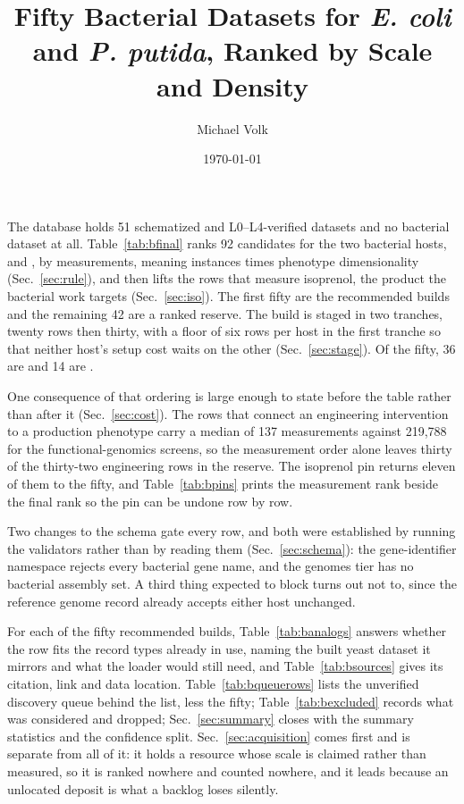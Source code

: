 \documentclass[10pt,a4paper]{article}
\title{\vspace{-1.5em}Fifty Bacterial Datasets for \emph{E. coli} and \emph{P. putida},
Ranked by Scale and Density}
\author{Michael Volk}
\date{\today}
\begin{document}
\maketitle
\thispagestyle{empty}

\noindent
The database holds 51 schematized and L0--L4-verified 
datasets and no bacterial dataset at all. Table~\ref{tab:bfinal} ranks 92 candidates for
the two bacterial hosts,  and , by
measurements, meaning instances times phenotype dimensionality (Sec.~\ref{sec:rule}), and
then lifts the rows that measure isoprenol, the product the bacterial work targets
(Sec.~\ref{sec:iso}). The first fifty are the recommended builds and the remaining 42 are
a ranked reserve. The
build is staged in two tranches, twenty rows then thirty, with a floor of six rows per
host in the first tranche so that neither host's setup cost waits on the other
(Sec.~\ref{sec:stage}). Of the fifty, 36 are  and 14 are .

One consequence of that ordering is large enough to state before the table rather than
after it (Sec.~\ref{sec:cost}). The rows that connect an engineering intervention to a
production phenotype carry a median of 137 measurements against 219,788 for the
functional-genomics screens, so the measurement order alone leaves thirty of the
thirty-two engineering rows in the reserve. The isoprenol pin returns eleven of them to
the fifty, and Table~\ref{tab:bpins} prints the measurement rank beside the final rank so
the pin can be undone row by row.

Two changes to the schema gate every row, and both were established by running the
validators rather than by reading them (Sec.~\ref{sec:schema}): the gene-identifier
namespace rejects every bacterial gene name, and the genomes tier has no bacterial
assembly set. A third thing expected to block turns out not to, since the reference genome
record already accepts either host unchanged.

For each of the fifty recommended builds, Table~\ref{tab:banalogs} answers whether the
row fits the record types already in use, naming the built yeast dataset it mirrors and
what the loader would still need, and Table~\ref{tab:bsources} gives its citation, link
and data location. Table~\ref{tab:bqueuerows} lists the unverified discovery queue behind
the list, less the fifty; Table~\ref{tab:bexcluded} records what was considered and
dropped; Sec.~\ref{sec:summary} closes with the summary statistics and the confidence
split. Sec.~\ref{sec:acquisition} comes first and is separate from all of it: it holds a
resource whose scale is claimed rather than measured, so it is ranked nowhere and counted
nowhere, and it leads because an unlocated deposit is what a backlog loses silently.

\vspace{0.5em}
\tccontents
\clearpage










\end{document}
